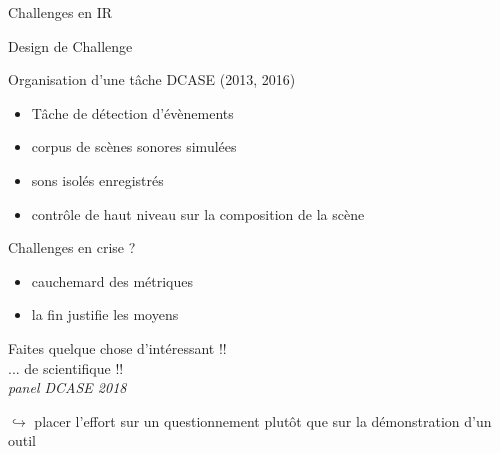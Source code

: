 \begin{frame}{Challenges en IR}
\begin{center}
\end{center}
\vspace{.8cm}
\end{frame}

\begin{frame}{Design de Challenge}
\begin{block}{Organisation d'une tâche DCASE (2013, 2016)}
\begin{itemize}
\item Tâche de détection d'évènements
\item corpus de scènes sonores simulées
\item sons isolés enregistrés
\item contrôle de haut niveau sur la composition de la scène
\end{itemize}
\end{block} 
\end{frame}

\begin{frame}{Challenges en crise ?}
\begin{itemize}
    \item cauchemard des métriques
    \item \og la fin justifie les moyens \fg
\end{itemize}
\vspace{.8cm}
\begin{center}
\og Faites quelque chose d'intéressant !! \fg \\
\og ... de scientifique !! \fg \\
\hfill \textit{panel DCASE 2018}
\end{center}
\vspace{.8cm}
$\hookrightarrow{}$ placer l'effort sur un questionnement plutôt que sur la démonstration d'un outil
\end{frame}

